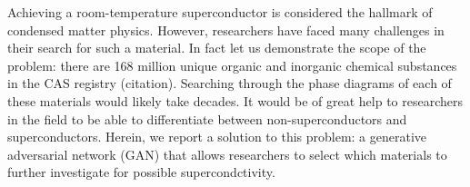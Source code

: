 \documentclass{article}
\begin{document}
Achieving a room-temperature superconductor is considered the hallmark of condensed matter physics.
However, researchers have faced many challenges in their search for such a material.
In fact let us demonstrate the scope of the problem: there are 168 million unique organic and inorganic chemical substances in the CAS registry (citation).
Searching through the phase diagrams of each of these materials would likely take decades.
It would be of great help to researchers in the field to be able to differentiate between non-superconductors and superconductors.
Herein, we report a solution to this problem: a generative adversarial network (GAN) that allows researchers to select which materials to further investigate for possible supercondctivity.
\end{document}
